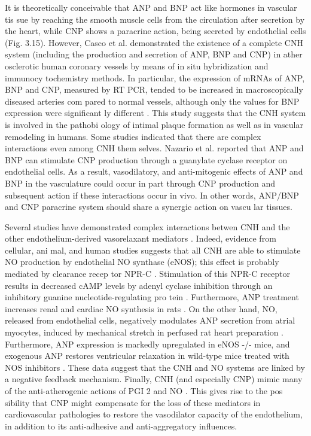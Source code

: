 \documentclass[14pt,a4paper,onecolumn]{extarticle}
\begin{document}
It is theoretically conceivable that ANP and BNP act like hormones in vascular tis sue by reaching the smooth muscle cells from the circulation after secretion by the heart, while CNP shows a paracrine action, being secreted by endothelial cells \citep{57}\citep{84}\citep{87}\citep{88} (Fig. 3.15). However, Casco et al. \citep{272} demonstrated the existence of a complete CNH system (including the production and secretion of ANP, BNP and CNP) in ather osclerotic human coronary vessels by means of in situ hybridization and immunocy tochemistry methods. In particular, the expression of mRNAs of ANP, BNP and CNP, measured by RT PCR, tended to be increased in macroscopically diseased arteries com pared to normal vessels, although only the values for BNP expression were significant ly different \citep{272}. This study suggests that the CNH system is involved in the pathobi ology of intimal plaque formation as well as in vascular remodeling in humans.  Some studies indicated that there are complex interactions even among CNH them selves. Nazario et al. \citep{273} reported that ANP and BNP can stimulate CNP production through a guanylate cyclase receptor on endothelial cells. As a result, vasodilatory, and anti-mitogenic effects of ANP and BNP in the vasculature could occur in part through CNP production and subsequent action if these interactions occur in vivo. In other words, ANP/BNP and CNP paracrine system should share a synergic action on vascu lar tissues.

Several studies have demonstrated complex interactions betwen CNH and the other endothelium-derived vasorelaxant mediators \citep{267}. Indeed, evidence from cellular, ani mal, and human studies suggests that all CNH are able to stimulate NO production by endothelial NO synthase (eNOS); this effect is probably mediated by clearance recep tor NPR-C \citep{270}. Stimulation of this NPR-C receptor results in decreased cAMP levels by adenyl cyclase inhibition through an inhibitory guanine nucleotide-regulating pro tein \citep{270}. Furthermore, ANP treatment increases renal and cardiac NO synthesis in rats \citep{274}. On the other hand, NO, released from endothelial cells, negatively modulates ANP secretion from atrial myocytes, induced by mechanical stretch in perfused rat heart preparation \citep{275}. Furthermore, ANP expression is markedly upregulated in eNOS -/- mice, and exogenous ANP restores ventricular relaxation in wild-type mice treated with NOS inhibitors \citep{276}. These data suggest that the CNH and NO systems are linked by a negative feedback mechanism. Finally, CNH (and especially CNP) mimic many of the anti-atherogenic actions of PGI 2 and NO \citep{267}. This gives rise to the pos sibility that CNP might compensate for the loss of these mediators in cardiovascular pathologies to restore the vasodilator capacity of the endothelium, in addition to its anti-adhesive and anti-aggregatory influences.
\end{document}
